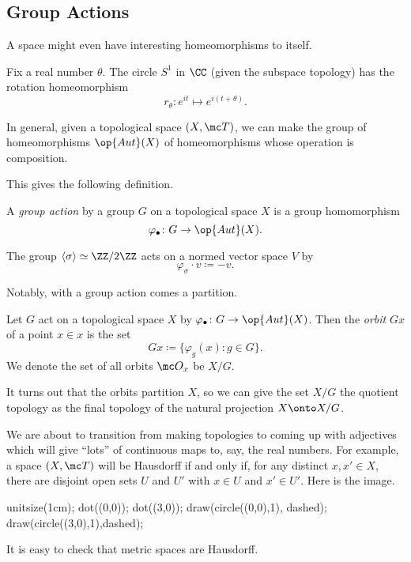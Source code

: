 \documentclass[../notes.tex]{subfiles}
\begin{document}
\subsection{Group Actions}
A space might even have interesting homeomorphisms to itself.
\begin{example}
	Fix a real number $\theta$. The circle $S^1$ in $\CC$ (given the subspace topology) has the rotation homeomorphism
	\[r_\theta\colon e^{it}\mapsto e^{i(t+\theta)}.\]
\end{example}
\begin{remark}
	In general, given a topological space $(X,\mc T)$, we can make the group of homeomorphisms $\op{Aut}(X)$ of homeomorphisms whose operation is composition.
\end{remark}
This gives the following definition.
\begin{definition}
	A \textit{group action} by a group $G$ on a topological space $X$ is a group homomorphism
	\[\varphi_\bullet\colon G\to\op{Aut}(X).\]
\end{definition}
\begin{example}
	The group $\langle\sigma\rangle\simeq\ZZ/2\ZZ$ acts on a normed vector space $V$ by
	\[\varphi_\sigma\cdot v\coloneqq-v.\]
\end{example}
Notably, with a group action comes a partition.
\begin{definition}[Orbit]
	Let $G$ act on a topological space $X$ by $\varphi_\bullet\colon G\to\op{Aut}(X)$. Then the \textit{orbit} $Gx$ of a point $x\in x$ is the set
	\[Gx\coloneqq\{\varphi_g(x):g\in G\}.\]
	We denote the set of all orbits $\mc O_x$ be $X/G$.
\end{definition}
It turns out that the orbits partition $X$, so we can give the set $X/G$ the quotient topology as the final topology of the natural projection $X\onto X/G$.
\begin{remark}
	We are about to transition from making topologies to coming up with adjectives which will give ``lots'' of continuous maps to, say, the real numbers. For example, a space $(X,\mc T)$ will be Hausdorff if and only if, for any distinct $x,x'\in X$, there are disjoint open sets $U$ and $U'$ with $x\in U$ and $x'\in U'$. Here is the image.
	\begin{center}
		\begin{asy}
			unitsize(1cm);
			dot((0,0)); dot((3,0));
			draw(circle((0,0),1), dashed); draw(circle((3,0),1),dashed);
		\end{asy}
	\end{center}
	It is easy to check that metric spaces are Hausdorff.
\end{remark}
\end{document}
